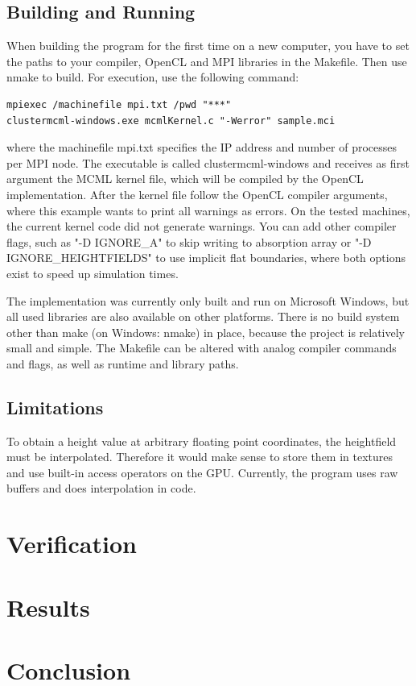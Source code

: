 \documentclass[]{article}
\begin{document}
\subsection{Building and Running}

When building the program for the first time on a new computer, you have to set the paths to your compiler, OpenCL and MPI libraries in the Makefile. Then use nmake to build. For execution, use the following command:

\begin{lstlisting}
mpiexec /machinefile mpi.txt /pwd "***"
clustermcml-windows.exe mcmlKernel.c "-Werror" sample.mci
\end{lstlisting}

where the machinefile mpi.txt specifies the IP address and number of processes per MPI node. The executable is called clustermcml-windows and receives as first argument the MCML kernel file, which will be compiled by the OpenCL implementation. After the kernel file follow the OpenCL compiler arguments, where this example wants to print all warnings as errors. On the tested machines, the current kernel code did not generate warnings. You can add other compiler flags, such as "-D IGNORE\_A" to skip writing to absorption array or "-D IGNORE\_HEIGHTFIELDS" to use implicit flat boundaries, where both options exist to speed up simulation times.

The implementation was currently only built and run on Microsoft Windows, but all used libraries are also available on other platforms. There is no build system other than make (on Windows: nmake) in place, because the project is relatively small and simple. The Makefile can be altered with analog compiler commands and flags, as well as runtime and library paths.

\subsection{Limitations}

To obtain a height value at arbitrary floating point coordinates, the heightfield must be interpolated. Therefore it would make sense to store them in textures and use built-in access operators on the GPU. Currently, the program uses raw buffers and does interpolation in code.

\section{Verification}

\section{Results}

\section{Conclusion}


\end{document}
